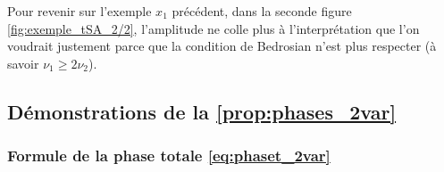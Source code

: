 Pour revenir sur l'exemple $x_1$ précédent, dans la seconde figure \ref{fig:exemple_tSA_2/2}, l'amplitude ne colle plus à l'interprétation que l'on voudrait justement parce que la condition de Bedrosian n'est plus respecter (à savoir $\nu_1\geq 2\nu_2$). 




\subsection{Démonstrations de la \cref{prop:phases_2var}}\label{ann:demo_phases_2var}

\subsubsection{Formule de la phase totale \eqref{eq:phaset_2var}}

